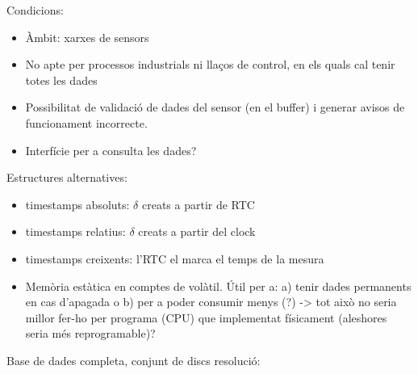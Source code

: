 Condicions:
\begin{itemize}
\item Àmbit: xarxes de sensors
\item No apte per processos industrials ni llaços de control, en els
  quals cal tenir totes les dades
\item Possibilitat de validació de dades del sensor (en el buffer) i
  generar avisos de funcionament incorrecte.
\item Interfície per a consulta les dades?
\end{itemize}





Estructures alternatives:
\begin{itemize}
\item timestamps absoluts: $\delta$ creats a partir de RTC
\item timestamps relatius: $\delta$ creats a partir del clock
\item timestamps creixents: l'RTC el marca el temps de la mesura
\item Memòria estàtica en comptes de volàtil. Útil per a: a) tenir dades permanents en cas d'apagada o b) per a poder consumir menys (?)   ->  tot això no seria millor fer-ho per programa (CPU) que implementat físicament (aleshores seria més reprogramable)?
\end{itemize}





Base de dades completa, conjunt de discs resolució:
\usetikzlibrary{shapes,arrows,positioning}

